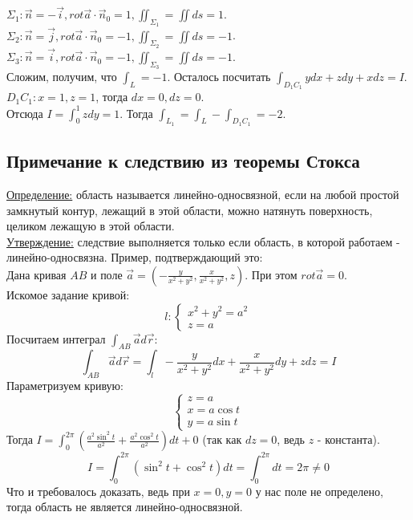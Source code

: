 \documentclass[12pt]{article}
\begin{document}
$\Sigma_1 : \overrightarrow{n} = -\overrightarrow{i}, rot \overrightarrow{a} \cdot \overrightarrow{n}_0 = 1, \iint_{\Sigma_1} = \iint ds = 1$.\\
$\Sigma_2 : \overrightarrow{n} = \overrightarrow{j}, rot \overrightarrow{a} \cdot \overrightarrow{n}_0 = -1, \iint_{\Sigma_2} = \iint ds = -1$.\\
$\Sigma_3 : \overrightarrow{n} = \overrightarrow{i}, rot \overrightarrow{a} \cdot \overrightarrow{n}_0 = -1, \iint_{\Sigma_3} = \iint ds = -1$.\\
Сложим, получим, что $\int_L = -1$. Осталось посчитать $\int_{D_1C_1} ydx + zdy + xdz = I$.\\
$D_1C_1 : x = 1, z = 1$, тогда $dx = 0, dz = 0$.\\
Отсюда $I = \int_0^1 zdy = 1$. Тогда $\int_{L_1} = \int_L - \int_{D_1C_1} = -2$.\\
\subsection{Примечание к следствию из теоремы Стокса}
\uline{Определение:} область называется линейно-односвязной, если на любой простой замкнутый контур, лежащий в этой области, можно натянуть поверхность, целиком лежащую в этой области.\\
\uline{Утверждение:} следствие выполняется только если область, в которой работаем - линейно-односвязна.
Пример, подтверждающий это:\\
Дана кривая $AB$ и поле $\overrightarrow{a} = (-\frac{y}{x^2 + y^2}, \frac{x}{x^2 + y^2}, z)$. При этом $rot \overrightarrow{a} = 0$.\\
Искомое задание кривой:\\
$$l :\begin{cases} x^2 + y^2 = a^2 \\ z = a \end{cases}$$
Посчитаем интеграл $\int_{AB} \overrightarrow{a} d \overrightarrow{r}$:\\
$$\int_{AB} \overrightarrow{a} d \overrightarrow{r} = \int_l -\frac{y}{x^2 + y^2} dx + \frac{x}{x^2 + y^2} dy + zdz = I$$
Параметризуем кривую:\\
$$\begin{cases} z = a \\ x = a \cos t \\ y = a \sin t \end{cases}$$
Тогда $I = \int_0^{2 \pi} (\frac{a^2 \sin^2 t}{a^2} + \frac{a^2 \cos^2 t}{a^2}) dt + 0$ (так как $dz = 0$, ведь $z$ - константа).\\
$$I = \int_0^{2 \pi} (\sin^2 t + \cos^2 t) dt = \int_0^{2 \pi} dt = 2 \pi \neq 0$$
Что и требовалось доказать, ведь при $x = 0, y = 0$ у нас поле не определено, тогда область не является линейно-односвязной.\\
\end{document}
